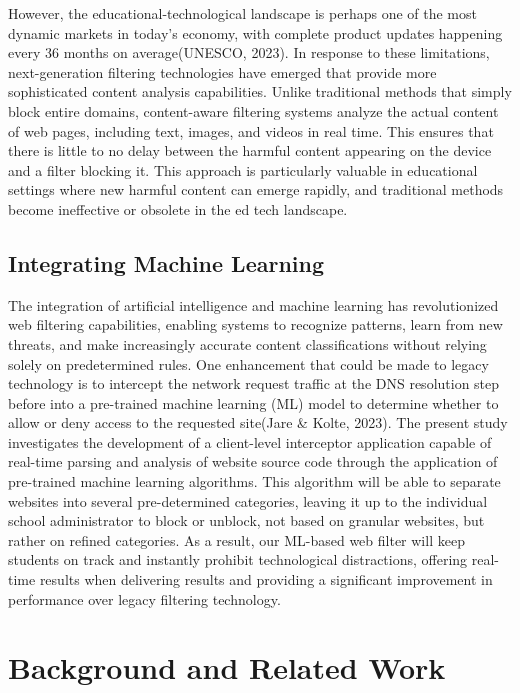 \documentclass[
  titlepage]{article}
\begin{document}
However, the educational-technological landscape is perhaps one of the
most dynamic markets in today's economy, with complete product updates
happening every 36 months on average(UNESCO, 2023). In response to these
limitations, next-generation filtering technologies have emerged that
provide more sophisticated content analysis capabilities. Unlike
traditional methods that simply block entire domains, content-aware
filtering systems analyze the actual content of web pages, including
text, images, and videos in real time. This ensures that there is little
to no delay between the harmful content appearing on the device and a
filter blocking it. This approach is particularly valuable in
educational settings where new harmful content can emerge rapidly, and
traditional methods become ineffective or obsolete in the ed tech
landscape.

\subsection{Integrating Machine
Learning}\label{integrating-machine-learning}

The integration of artificial intelligence and machine learning has
revolutionized web filtering capabilities, enabling systems to recognize
patterns, learn from new threats, and make increasingly accurate content
classifications without relying solely on predetermined rules. One
enhancement that could be made to legacy technology is to intercept the
network request traffic at the DNS resolution step before into a
pre-trained machine learning (ML) model to determine whether to allow or
deny access to the requested site(Jare \& Kolte, 2023). The present
study investigates the development of a client-level interceptor
application capable of real-time parsing and analysis of website source
code through the application of pre-trained machine learning algorithms.
This algorithm will be able to separate websites into several
pre-determined categories, leaving it up to the individual school
administrator to block or unblock, not based on granular websites, but
rather on refined categories. As a result, our ML-based web filter will
keep students on track and instantly prohibit technological
distractions, offering real-time results when delivering results and
providing a significant improvement in performance over legacy filtering
technology.

\section{Background and Related Work}\label{background-and-related-work}
\end{document}
